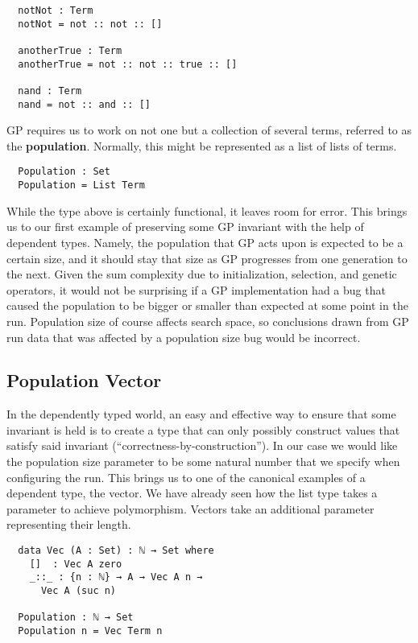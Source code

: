 \documentclass[runningheads,a4paper]{llncs}
\begin{document}
\begin{verbatim}
  notNot : Term
  notNot = not :: not :: []

  anotherTrue : Term
  anotherTrue = not :: not :: true :: []

  nand : Term
  nand = not :: and :: []
\end{verbatim}

GP requires us to work on not one but a collection of several terms,
referred to as the \textbf{population}. Normally, this might be
represented as a list of lists of terms.

\begin{verbatim}
  Population : Set
  Population = List Term
\end{verbatim}

While the type above is certainly functional, it leaves room for
error. This brings us to our first example of preserving some GP
invariant with the help of dependent types. Namely, the population
that GP acts upon is expected to be a certain size, and it should stay
that size as GP progresses from one generation to the next. Given the
sum complexity due to initialization, selection, and genetic
operators, it would not be surprising if a GP implementation had a bug
that caused the population to be bigger or smaller than expected
at some point in the run. Population size of course affects search
space, so conclusions drawn from GP run data that was affected by a
population size bug would be incorrect.

\subsection{Population Vector}

In the dependently typed world, an easy and effective way to ensure
that some invariant is held is to create a type that can only possibly
construct values that satisfy said invariant
(``correctness-by-construction''). In our case we would
like the population size parameter to be some natural number
that we specify when configuring the run. This brings us to one of
the canonical examples of a dependent type, the vector. We have
already seen how the list type takes a parameter to achieve
polymorphism. Vectors take an additional parameter representing their
length.

\begin{verbatim}
  data Vec (A : Set) : ℕ → Set where
    []  : Vec A zero
    _::_ : {n : ℕ} → A → Vec A n →
      Vec A (suc n)

  Population : ℕ → Set
  Population n = Vec Term n
\end{verbatim}
\end{document}
